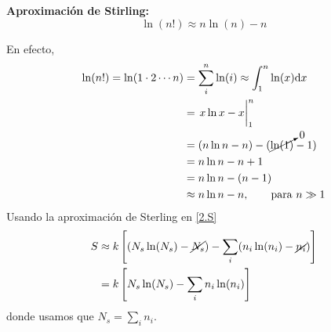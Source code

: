 \textbf{Aproximación de Stirling:}
\begin{equation}\label{Stearling}
  \boxed{\ln(n!)\approx n\ln(n)-n}
\end{equation}

En efecto,
\begin{align}
  \ln(n!)=\ln(1\cdot 2\cdots n)&=\sum_i^n\ln(i)\approx\int_1^n\ln(x)\dd x\\
  &=\eval{x\ln x-x}_1^n\\
  &=(n\ln n-n)-(\cancelto{0}{\ln(1)}-1)\\
  &=n\ln n-n+1\\
  &=n\ln n-(n-1)\\
  &\approx n\ln n-n,\qquad \text{para $n\gg 1$}
\end{align}
Usando la aproximación de Sterling en \eqref{2.S}
\begin{align}
  S&\approx k\left[(N_s\ln(N_s)-\cancel{N_s})-\sum_i (n_i\ln(n_i)-\cancel{n_i})\right]\\
  &=k\left[N_s\ln(N_s)-\sum_in_i\ln(n_i)\right]
\end{align}
donde usamos que $N_s=\sum_i n_i$.

